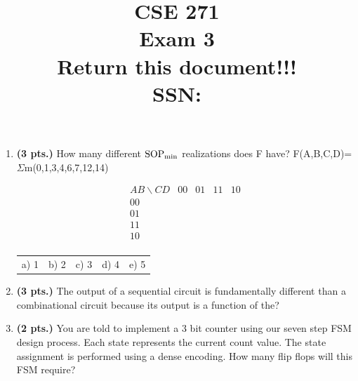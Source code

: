 \documentclass{article}
\begin{document}
\newcommand{\SOPmin}{${\rm SOP}_{\rm min} \ $}
\newcommand{\POSmin}{${\rm POS}_{\rm min} \ $}
\newcommand{\bs}{\backslash}
\newcommand{\x}{\addtocounter{enumi}{1} \theenumi}


\title{
\Huge{CSE 271}\\
\normalsize{Exam 3}\\
\normalsize{Return this document!!!}\\
SSN:}
\date{}

\maketitle{}

\begin{enumerate}
\item {\bf (3 pts.)} How many different \SOPmin realizations does F have?
F(A,B,C,D)=$\Sigma$m(0,1,3,4,6,7,12,14)

$$ \begin{array} {c||c|c|c|c}
        AB \bs CD & 00 & 01 & 11 & 10 \\ \hline \hline
        00        &    &    &    &    \\ \hline
        01        &    &    &    &    \\ \hline
        11        &    &    &    &    \\ \hline
        10        &    &    &    &    \\
\end{array} $$ 

\begin{tabular}{p{0.75in}p{0.75in}p{0.75in}p{0.75in}p{0.75in}}
a) 1 & b) 2 & c) 3 & d) 4 & e) 5 \\
\end{tabular}

\item {\bf (3 pts.)} The output of a sequential circuit is fundamentally
different than a combinational circuit because its output is a function
of the?

\item {\bf (2 pts.)} You are told to implement a 3 bit counter using our seven
step FSM design process.  Each state represents the current count value.  The
state assignment is performed using a dense encoding. 
How many flip flops will this FSM require?


\end{enumerate}
\end{document}
